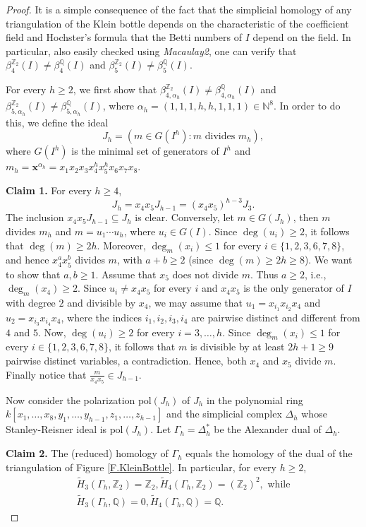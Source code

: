 \documentclass[11pt,oneside]{amsart}
\theoremstyle{plain}
\theoremstyle{definition}
\newcommand{\Q}{\mathbb{Q}}
\newcommand{\Z}{\mathbb{Z}}
\begin{document}
\begin{proof}
It is a simple consequence of the fact that the simplicial homology of
any triangulation of the Klein bottle depends on the characteristic of the coefficient field and Hochster's formula \cite{H77} that the Betti numbers of $I$ depend on the field. In particular, also easily checked using \textit{Macaulay2}, one can verify that $\beta_4^{\Z_2}(I) \neq \beta_4^{\Q}(I)$ and $\beta_5^{\Z_2}(I) \neq \beta_5^{\Q}(I)$.

For every $h \geq 2$, we first show that $\beta_{4,\alpha_h}^{\Z_2}(I) \neq \beta_{4,\alpha_h}^{\Q}(I)$ and $\beta_{5,\alpha_h}^{\Z_2}(I) \neq \beta_{5,\alpha_h}^{\Q}(I)$, where $\alpha_h=(1,1,1,h,h,1,1,1) \in \mathbb N^8$. In order to do this, we define the ideal
\[
J_h=(m \in G(I^h) : m \text{ divides } m_h ),
\]
where $G(I^h)$ is the minimal set of generators of $I^h$ and $m_h=\mathbf{x}^{\alpha_h}=x_1x_2x_3x_4^hx_5^hx_6x_7x_8$.

\textbf{Claim 1.} For every $h \geq 4$,
\[
J_h=x_4x_5 J_{h-1} = (x_4x_5)^{h-3} J_3.
\]
The inclusion $x_4x_5 J_{h-1} \subseteq J_h$ is clear. Conversely, let $m \in G(J_h)$, then $m$ divides $m_h$ and $m=u_1 \cdots u_h$, where $u_i \in G(I)$. Since $\deg(u_i) \geq 2$, it follows that $\deg(m) \geq 2h$. Moreover, $\deg_m(x_i) \leq 1$ for every $i \in \{1,2,3,6,7,8\}$, and hence $x_4^a x_5^b$ divides $m$, with $a+b \geq 2$ (since $\deg(m) \geq 2h \geq 8$). We want to show that $a,b \geq 1$. Assume that $x_5$ does not divide $m$. Thus $a \geq 2$, i.e., $\deg_m(x_4) \geq 2$. Since $u_i \neq x_4x_5$ for every $i$ and $x_4x_5$ is the only generator of $I$ with degree $2$ and divisible by $x_4$, we may assume that $u_1=x_{i_1}x_{i_2}x_4$ and $u_2=x_{i_3}x_{i_4}x_4$, where the indices $i_1,i_2,i_3,i_4$ are pairwise distinct and different from $4$ and $5$. Now, $\deg(u_i) \geq 2$ for every $i=3,\dots,h$. Since $\deg_m(x_i) \leq 1$ for every $i \in \{1,2,3,6,7,8\}$, it follows that $m$ is divisible by at least $2h+1 \geq 9$ pairwise distinct variables, a contradiction. Hence, both $x_4$ and $x_5$ divide $m$. Finally notice that $\frac{m}{x_4x_5} \in J_{h-1}$.

Now consider the polarization $\mathrm{pol}(J_h)$ of $J_h$ in the polynomial ring \break $ k[x_1,\dots,x_8,y_1,\dots,y_{h-1},z_1,\dots,z_{h-1}]$ and the simplicial complex $\Delta_h$ whose Stanley-Reisner ideal is $\mathrm{pol}(J_h)$. Let $\Gamma_h = \Delta_h^\ast$ be the Alexander dual of $\Delta_h$.

\textbf{Claim 2.} The (reduced) homology of $\Gamma_h$ equals the homology of the dual of the triangulation of Figure \ref{F.KleinBottle}. In particular, for every $h \geq 2$,
\begin{gather*}
\widetilde H_3(\Gamma_h,\mathbb Z_2) = \mathbb Z_2, \widetilde H_4(\Gamma_h,\mathbb Z_2) = (\mathbb Z_2)^2, \text{ while}\\
\widetilde H_3(\Gamma_h,\Q) = 0, \widetilde H_4(\Gamma_h,\Q) = \Q.
\end{gather*}


\end{proof}
\end{document}

